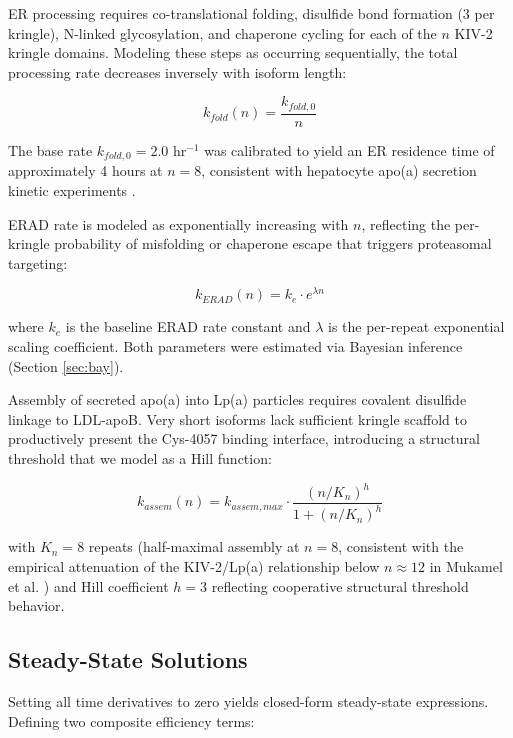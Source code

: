 \documentclass[12pt,letterpaper]{article}
\begin{document}
ER processing requires co-translational folding, disulfide bond formation (3 per kringle), N-linked glycosylation, and chaperone cycling for each of the $n$ KIV-2 kringle domains. Modeling these steps as occurring sequentially, the total processing rate decreases inversely with isoform length:

\begin{equation}\label{eq:7}
    k_{fold}(n) = \frac{k_{fold,0}}{n}
\end{equation}

The base rate $k_{fold,0} = 2.0$ hr$^{-1}$ was calibrated to yield an ER residence time of approximately 4 hours at $n = 8$, consistent with hepatocyte apo(a) secretion kinetic experiments \citep{white1994molecular}.

ERAD rate is modeled as exponentially increasing with $n$, reflecting the per-kringle probability of misfolding or chaperone escape that triggers proteasomal targeting:

\begin{equation}\label{eq:8}
    k_{ERAD}(n) = k_e \cdot e^{\lambda n}
\end{equation}

where $k_e$ is the baseline ERAD rate constant and $\lambda$ is the per-repeat exponential scaling coefficient. Both parameters were estimated via Bayesian inference (Section \ref{sec:bay}).

Assembly of secreted apo(a) into Lp(a) particles requires covalent disulfide linkage to LDL-apoB. Very short isoforms lack sufficient kringle scaffold to productively present the Cys-4057 binding interface, introducing a structural threshold that we model as a Hill function:

\begin{equation}\label{eq:9}
    k_{assem}(n) = k_{assem,max} \cdot \frac{(n/K_n)^h}{1 + (n/K_n)^h}
\end{equation}

with $K_n = 8$ repeats (half-maximal assembly at $n = 8$, consistent with the empirical attenuation of the KIV-2/Lp(a) relationship below $n \approx 12$ in Mukamel et al. \citep{mukamel2021protein}) and Hill coefficient $h = 3$ reflecting cooperative structural threshold behavior.

\subsection{Steady-State Solutions}

Setting all time derivatives to zero yields closed-form steady-state expressions. Defining two composite efficiency terms:
\end{document}
